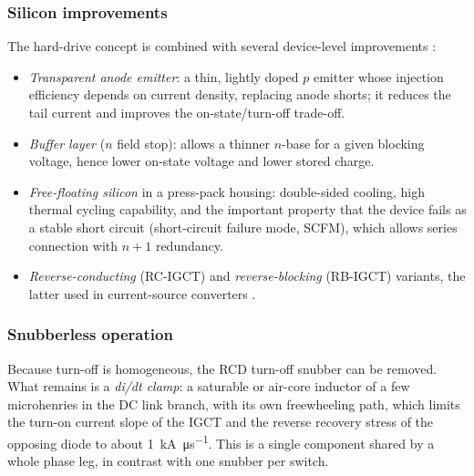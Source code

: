 \subsubsection{Silicon improvements}

The hard-drive concept is combined with several device-level improvements
\cite{steimer1999igct,lutz2011}:

\begin{itemize}[nosep]
  \item \emph{Transparent anode emitter}: a thin, lightly doped $p$ emitter whose
        injection efficiency depends on current density, replacing anode shorts;
        it reduces the tail current and improves the on-state/turn-off trade-off.
  \item \emph{Buffer layer} ($n$ field stop): allows a thinner $n$-base for a
        given blocking voltage, hence lower on-state voltage and lower stored
        charge.
  \item \emph{Free-floating silicon} in a press-pack housing: double-sided
        cooling, high thermal cycling capability, and the important property that
        the device fails as a stable short circuit (short-circuit failure mode,
        SCFM), which allows series connection with $n+1$ redundancy.
  \item \emph{Reverse-conducting} (RC-IGCT) and \emph{reverse-blocking}
        (RB-IGCT) variants, the latter used in current-source converters
        \cite{weber2000rbigct}.
\end{itemize}

\subsubsection{Snubberless operation}

Because turn-off is homogeneous, the RCD turn-off snubber can be removed. What
remains is a \emph{di/dt clamp}: a saturable or air-core inductor of a few
microhenries in the DC link branch, with its own freewheeling path, which limits
the turn-on current slope of the IGCT and the reverse recovery stress of the
opposing diode to about \SI{1}{\kilo\ampere\per\micro\second}. This is a single
component shared by a whole phase leg, in contrast with one snubber per switch.

